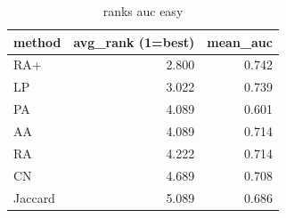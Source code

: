 \begin{table}[t]
\centering
\caption{ranks auc easy}
\label{tab:ranks_auc_easy}
\begin{tabular}{lrr}
\hline
method & avg\_rank (1=best) & mean\_auc \\
\hline
RA+ & 2.800 & 0.742 \\
LP & 3.022 & 0.739 \\
PA & 4.089 & 0.601 \\
AA & 4.089 & 0.714 \\
RA & 4.222 & 0.714 \\
CN & 4.689 & 0.708 \\
Jaccard & 5.089 & 0.686 \\
\hline
\end{tabular}
\end{table}